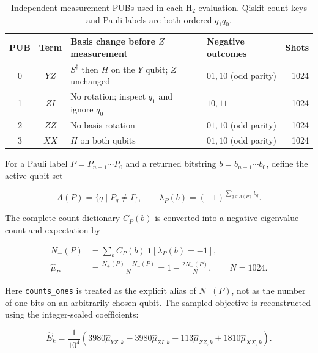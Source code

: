\begin{table}[t]
  \centering
  \caption{Independent measurement PUBs used in each $\mathrm{H}_2$ evaluation.  Qiskit count keys and Pauli labels are both ordered $q_1q_0$.}
  \label{tab:rv-measurements}
  \renewcommand{\arraystretch}{1.12}
  \begin{tabular}{ccp{}p{}r}
    \toprule
    PUB & Term & Basis change before $Z$ measurement & Negative outcomes & Shots \\
    \midrule
    0 & $YZ$ & $S^{\dagger}$ then $H$ on the $Y$ qubit; $Z$ unchanged
      & $01,10$ (odd parity) & 1024 \\
    1 & $ZI$ & No rotation; inspect $q_1$ and ignore $q_0$
      & $10,11$ & 1024 \\
    2 & $ZZ$ & No basis rotation
      & $01,10$ (odd parity) & 1024 \\
    3 & $XX$ & $H$ on both qubits
      & $01,10$ (odd parity) & 1024 \\
    \bottomrule
  \end{tabular}
\end{table}

For a Pauli label $P=P_{n-1}\cdots P_0$ and a returned bitstring
$b=b_{n-1}\cdots b_0$, define the active-qubit set

\begin{equation}
  A(P)=\{q\mid P_q\neq I\},
  \qquad
  \lambda_P(b)=(-1)^{\sum_{q\in A(P)}b_q}.
  \label{eq:rv-parity-sign}
\end{equation}

The complete count dictionary $C_P(b)$ is converted into a negative-eigenvalue
count and expectation by

\begin{align}
  N_{-}(P) &= \sum_b C_P(b)\,
    \mathbf{1}\!\left[\lambda_P(b)=-1\right],
    \label{eq:rv-negative-count}\\
  \widehat{\mu}_P &= \frac{N_{+}(P)-N_{-}(P)}{N}
    = 1-\frac{2N_{-}(P)}{N},
    \qquad N=1024.
    \label{eq:rv-expectation}
\end{align}

Here \texttt{counts\_ones} is treated as the explicit alias of
$N_{-}(P)$, not as the number of one-bits on an arbitrarily chosen qubit.  The
sampled objective is reconstructed using the integer-scaled coefficients:

\begin{equation}
  \widehat{E}_k = \frac{1}{10^4}
  \left(3980\widehat{\mu}_{YZ,k}
  -3980\widehat{\mu}_{ZI,k}
  -113\widehat{\mu}_{ZZ,k}
  +1810\widehat{\mu}_{XX,k}\right).
  \label{eq:rv-energy-reconstruction}
\end{equation}

